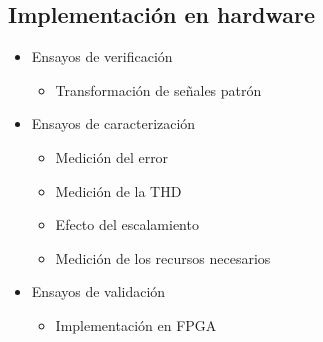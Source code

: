 \subsection{Implementación en hardware}

\begin{frame}{}%
  \Fontit
  \begin{itemize}
    \item<1-> Ensayos de verificación
    \begin{itemize}
      \Fontitit
      \item<1-> Transformación de señales patrón
    \end{itemize}
    \item<1-> Ensayos de caracterización
    \begin{itemize}
      \Fontitit
      \item<1-> Medición del error
      \item<1-> Medición de la THD
      \item<1-> Efecto del escalamiento
      \item<1-> Medición de los recursos necesarios 
    \end{itemize}
    \item<1-> Ensayos de validación
    \begin{itemize}
      \Fontitit
      \item<1-> Implementación en FPGA
    \end{itemize}
  \end{itemize}
\end{frame}

